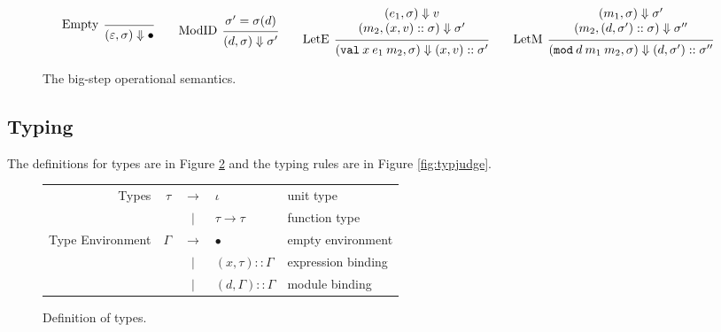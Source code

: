 \documentclass{article}
\theoremstyle{definition}
\newcommand*{\vbar}{|}
\newcommand*{\cons}{::}
\newcommand*{\modid}{d}
\newcommand*{\ctx}{\sigma}
\newcommand*{\semarrow}{\Downarrow}
\newcommand*{\Lete}{\mathtt{val}}
\newcommand*{\Letm}{\mathtt{mod}}
\begin{document}
\begin{figure}[h!]
  \[
    \begin{prooftree}
      \infer[left label=Empty]0{
      (\varepsilon, \ctx)
      \semarrow
      \bullet
      }
    \end{prooftree}\qquad
    \begin{prooftree}
      \hypo{\ctx'=\ctx(\modid)}
      \infer[left label=ModID]1{
      (\modid, \ctx)
      \semarrow
      \ctx'
      }
    \end{prooftree}\qquad
    \begin{prooftree}
      \hypo{
        \begin{matrix}
          (e_{1}, \ctx)
          \semarrow
          v \\
          (m_{2}, (x, v)\cons \ctx)
          \semarrow
          \ctx'
        \end{matrix}
      }
      \infer[left label=LetE]1{
      (\Lete\:x\:e_1\:m_2, \ctx)
      \semarrow
      (x,v)\cons\ctx'
      }
    \end{prooftree}\qquad
    \begin{prooftree}
      \hypo{
        \begin{matrix}
          (m_{1}, \ctx)
          \semarrow
          \ctx' \\
          (m_{2}, (\modid, \ctx')\cons \ctx)
          \semarrow
          \ctx''
        \end{matrix}
      }
      \infer[left label=LetM]1{
      (\Letm\:\modid\:m_{1}\:m_{2}, \ctx)
      \semarrow
      (\modid,\ctx')\cons\ctx''
      }
    \end{prooftree}
  \]
  \caption{The big-step operational semantics.}
  \label{fig:simpreach}
\end{figure}
\subsection{Typing}
The definitions for types are in Figure \ref{fig:typdom} and the typing rules are in Figure \ref{fig:typjudge}.

\begin{figure}[h!]
  \centering
  \begin{tabular}{rrcll}
    Types            & $\tau$   & $\rightarrow$ & $\iota$                       & unit type          \\
                     &          & $\vbar$       & $\tau\rightarrow\tau$         & function type      \\
    Type Environment & $\Gamma$ & $\rightarrow$ & $\bullet$                     & empty environment  \\
                     &          & $\vbar$       & $(x,\tau)\cons \Gamma$        & expression binding \\
                     &          & $\vbar$       & $(\modid,\Gamma)\cons \Gamma$ & module binding
  \end{tabular}
  \caption{Definition of types.}
  \label{fig:typdom}
\end{figure}
\end{document}
